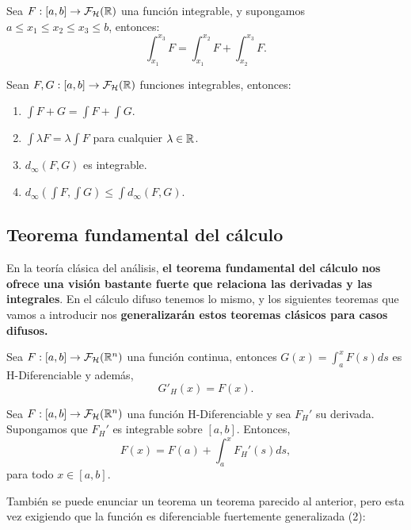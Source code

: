 \begin{teorema}
  Sea $F :  [a, b] \rightarrow \mathcal{F}_\mathcal{H}(\mathbb R)$ una función integrable, y supongamos $a \leq x_1 \leq x_2 \leq x_3 \leq b$, entonces:
  \[
  \int_{x_1}^{x_3} F = \int_{x_1}^{x_2} F + \int_{x_2}^{x_3} F.
  \]
\end{teorema}

\begin{teorema}
  Sean $F, G :  [a, b] \rightarrow \mathcal{F}_\mathcal{H}(\mathbb R)$ funciones integrables, entonces:
  
  \begin{enumerate}
  \item $\int F + G = \int F + \int G$.
  \item $\int \lambda F = \lambda \int F$ para cualquier $\lambda \in \mathbb R$.
  \item $d_\infty(F, G)$ es integrable.
  \item $d_\infty(\int F, \int G) \leq \int d_\infty(F, G)$.
  \end{enumerate}
\end{teorema}

\subsection{Teorema fundamental del cálculo}
En la teoría clásica del análisis, \textbf{el teorema fundamental del cálculo nos ofrece una visión bastante fuerte que relaciona las derivadas y las integrales}. En el cálculo difuso tenemos lo mismo, y los siguientes teoremas que vamos a introducir nos \textbf{generalizarán estos teoremas clásicos para casos difusos.}

\begin{teorema}
  Sea $F : [a, b] \rightarrow \mathcal{F}_\mathcal{H} (\mathbb R^n)$ una función continua, entonces $G(x) = \int_{a}^{x} F(s) ds$ es H-Diferenciable y además,
  \[
  G'_H(x) = F(x).
  \]
\end{teorema}

\begin{teorema}
  Sea $F : [a, b] \rightarrow  \mathcal{F}_\mathcal{H} (\mathbb R^n)$ una función H-Diferenciable y sea $F_H'$ su derivada. Supongamos que $F_H'$ es integrable sobre $[a, b]$. Entonces,
  \[
  F(x) = F(a) + \int_{a}^{x}F_H'(s) ds,
  \]
  para todo $x \in [a, b]$.
\end{teorema}

También se puede enunciar un teorema un teorema parecido al anterior, pero esta vez exigiendo que la función es diferenciable fuertemente generalizada (2):

